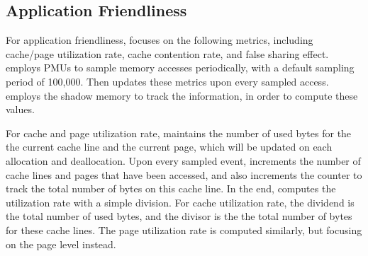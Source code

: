 \subsection{Application Friendliness}
\label{sec:profilefriendliness}

 
For application friendliness, \MP{} focuses on the following metrics, including cache/page utilization rate, cache contention rate, and false sharing effect. \MP{} employs PMUs to sample memory accesses periodically, with a default sampling period of 100,000. Then \MP{} updates these metrics upon every sampled access. \MP{} employs the shadow memory to track the information, in order to compute these values. 

For cache and page utilization rate, \MP{} maintains the number of used bytes for the  the current cache line and the current page, which will be updated on each allocation and deallocation. Upon every sampled event, \MP{} increments the number of cache lines and pages that have been accessed, and also increments the counter to track the total number of bytes on this cache line. In the end, \MP{} computes the utilization rate with a simple division. For cache utilization rate, the dividend is the total number of used bytes, and the divisor is the the total number of bytes for these cache lines. The page utilization rate is computed similarly, but focusing on the page level instead. 

